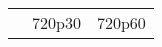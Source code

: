 \begin{center}
  \begin{table}[ht]
    \begin{tabular}{|>{\raggedleft}p{}|>{\raggedleft}p{}|>{\raggedleft}p{}| }   %
        & 720p30 & 720p60 \tabularnewline
    \end{tabular}
  \end{table}
\end{center}





